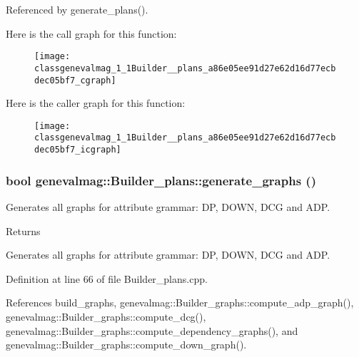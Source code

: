 Referenced by generate\_\-plans().



Here is the call graph for this function:\nopagebreak
\begin{figure}[H]
\begin{center}
\leavevmode
\texttt{[image: classgenevalmag\_1\_1Builder\_\_plans\_a86e05ee91d27e62d16d77ecbdec05bf7\_cgraph]}
\end{center}
\end{figure}




Here is the caller graph for this function:\nopagebreak
\begin{figure}[H]
\begin{center}
\leavevmode
\texttt{[image: classgenevalmag\_1\_1Builder\_\_plans\_a86e05ee91d27e62d16d77ecbdec05bf7\_icgraph]}
\end{center}
\end{figure}


\hypertarget{classgenevalmag_1_1Builder__plans_a9552dcef13af0de0f3f2ff59a330d15c}{
\subsubsection[{generate\_\-graphs}]{\setlength{\rightskip}{0pt plus 5cm}bool genevalmag::Builder\_\-plans::generate\_\-graphs ()}}
\label{classgenevalmag_1_1Builder__plans_a9552dcef13af0de0f3f2ff59a330d15c}
Generates all graphs for attribute grammar: DP, DOWN, DCG and ADP. \begin{DoxyReturn}{Returns}

\end{DoxyReturn}
Generates all graphs for attribute grammar: DP, DOWN, DCG and ADP. 

Definition at line 66 of file Builder\_\-plans.cpp.



References build\_\-graphs, genevalmag::Builder\_\-graphs::compute\_\-adp\_\-graph(), genevalmag::Builder\_\-graphs::compute\_\-dcg(), genevalmag::Builder\_\-graphs::compute\_\-dependency\_\-graphs(), and genevalmag::Builder\_\-graphs::compute\_\-down\_\-graph().



